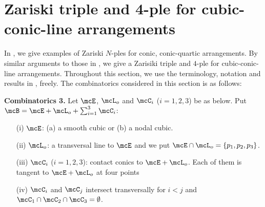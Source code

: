 

\section{Zariski triple and 4-ple for cubic-conic-line arrangements}\label{sec:3}

In \cite{bannai-tokunaga}, we give examples of Zariski $N$-ples for conic, 
conic-quartic arrangements. By similar  arguments to those in \cite{bannai-tokunaga},
we give a Zarisiki triple and $4$-ple for cubic-conic-line arrangements. 
Throughout this section, we use the terminology, notation  and results in \cite{bannai-tokunaga}, freely.
The combinatorics considered in this section is as follows:

\bigskip

{\bf Combinatorics 3.}
Let $\mcE$, $\mcL_o$ and $\mcC_i$ ($i = 1, 2, 3$) be as below. Put  $\mcB = \mcE  + \mcL_o + \sum_{i=1}^3 \mcC_i$:

\begin{enumerate}

\item[(i)] $\mcE$: (a)  a smooth cubic or  (b) a nodal cubic. 

\item[(ii)] $\mcL_o$: a transversal line to $\mcE$ and we put $\mcE \cap \mcL_o = \{p_1, p_2, p_3\}$.

\item[(iii)] $\mcC_i$ ($i = 1, 2, 3$):  contact conics to $\mcE + \mcL_o$. Each of them
is tangent to $\mcE + \mcL_o$ at four points

\item[(iv)] $\mcC_i$ and $\mcC_j$ intersect transversally for $i < j$ and  $\mcC_1\cap \mcC_2 \cap \mcC_3 = \emptyset$.

\end{enumerate}



%
%
%
%
%
%
%
%
%
%

